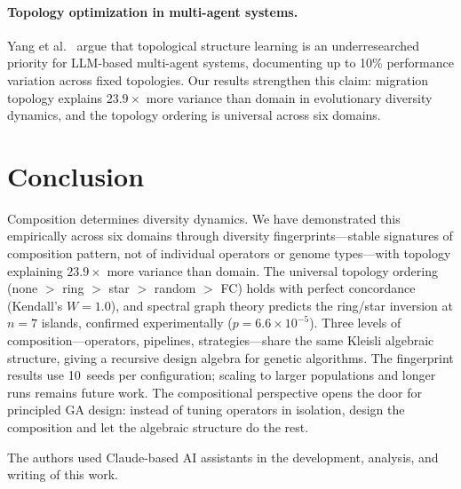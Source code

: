 \documentclass[dvipsnames,format=sigconf,anonymous=false,review=false]{acmart}
\begin{document}
\paragraph{Topology optimization in multi-agent systems.}
Yang et al.~\cite{yang2025topology} argue that topological structure learning is an underresearched priority for LLM-based multi-agent systems, documenting up to 10\% performance variation across fixed topologies. Our results strengthen this claim: migration topology explains $23.9\times$ more variance than domain in evolutionary diversity dynamics, and the topology ordering is universal across six domains.

\section{Conclusion}

Composition determines diversity dynamics. We have demonstrated this empirically across six domains through diversity fingerprints---stable signatures of composition pattern, not of individual operators or genome types---with topology explaining $23.9\times$ more variance than domain. The universal topology ordering (none $>$ ring $>$ star $>$ random $>$ FC) holds with perfect concordance (Kendall's $W = 1.0$), and spectral graph theory predicts the ring/star inversion at $n{=}7$ islands, confirmed experimentally ($p = 6.6 \times 10^{-5}$). Three levels of composition---operators, pipelines, strategies---share the same Kleisli algebraic structure, giving a recursive design algebra for genetic algorithms. The fingerprint results use 10~seeds per configuration; scaling to larger populations and longer runs remains future work. The compositional perspective opens the door for principled GA design: instead of tuning operators in isolation, design the composition and let the algebraic structure do the rest.

\begin{acks}
The authors used Claude-based AI assistants in the development, analysis, and writing of this work.
\end{acks}



\end{document}
